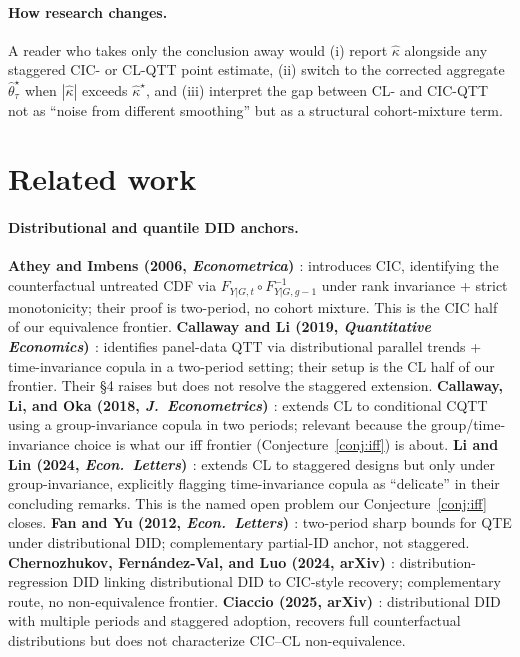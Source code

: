 \documentclass[11pt]{article}
\theoremstyle{definition}
\theoremstyle{plain}
\theoremstyle{remark}
\begin{document}
\paragraph{How research changes.} A reader who takes only the conclusion away would (i) report $\hat\kappa$ alongside any staggered CIC- or CL-QTT point estimate, (ii) switch to the corrected aggregate $\hat\theta^{\star}_\tau$ when $|\hat\kappa|$ exceeds $\hat\kappa^\star$, and (iii) interpret the gap between CL- and CIC-QTT not as ``noise from different smoothing'' but as a structural cohort-mixture term.

\section{Related work}

\paragraph{Distributional and quantile DID anchors.}
\textbf{Athey and Imbens (2006, \emph{Econometrica}) \cite{AtheyImbens2006}}: introduces CIC, identifying the counterfactual untreated CDF via $F_{Y|G,t} \circ F^{-1}_{Y|G,g-1}$ under rank invariance + strict monotonicity; their proof is two-period, no cohort mixture. This is the CIC half of our equivalence frontier.
\textbf{Callaway and Li (2019, \emph{Quantitative Economics}) \cite{CallawayLi2019}}: identifies panel-data QTT via distributional parallel trends + time-invariance copula in a two-period setting; their setup is the CL half of our frontier. Their \S4 raises but does not resolve the staggered extension.
\textbf{Callaway, Li, and Oka (2018, \emph{J.\ Econometrics}) \cite{CallawayLiOka2018}}: extends CL to conditional CQTT using a group-invariance copula in two periods; relevant because the group/time-invariance choice is what our iff frontier (Conjecture~\ref{conj:iff}) is about.
\textbf{Li and Lin (2024, \emph{Econ.\ Letters}) \cite{LiLin2024}}: extends CL to staggered designs but only under group-invariance, explicitly flagging time-invariance copula as ``delicate'' in their concluding remarks. This is the named open problem our Conjecture~\ref{conj:iff} closes.
\textbf{Fan and Yu (2012, \emph{Econ.\ Letters}) \cite{FanYu2012}}: two-period sharp bounds for QTE under distributional DID; complementary partial-ID anchor, not staggered.
\textbf{Chernozhukov, Fern\'andez-Val, and Luo (2024, arXiv) \cite{ChernozhukovFernandezValLuo2024}}: distribution-regression DID linking distributional DID to CIC-style recovery; complementary route, no non-equivalence frontier.
\textbf{Ciaccio (2025, arXiv) \cite{Ciaccio2025}}: distributional DID with multiple periods and staggered adoption, recovers full counterfactual distributions but does not characterize CIC--CL non-equivalence.
\end{document}
